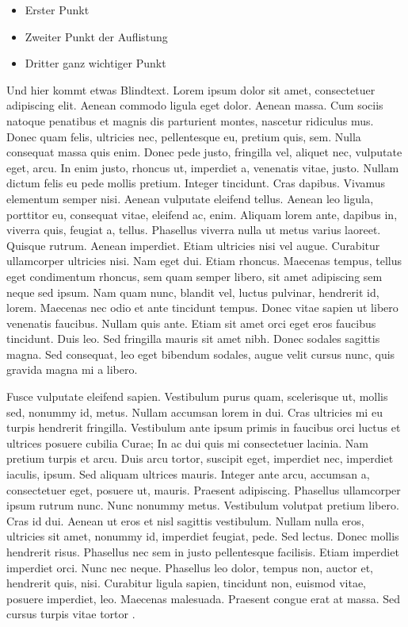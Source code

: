 \begin{itemize}
	\item Erster Punkt
	\item Zweiter Punkt der Auflistung
	\item Dritter ganz wichtiger Punkt
\end{itemize}

Und hier kommt etwas Blindtext. Lorem ipsum dolor sit amet, consectetuer adipiscing elit. Aenean commodo ligula eget dolor. Aenean massa. Cum sociis natoque penatibus et magnis dis parturient montes, nascetur ridiculus mus. Donec quam felis, ultricies nec, pellentesque eu, pretium quis, sem. Nulla consequat massa quis enim. Donec pede justo, fringilla vel, aliquet nec, vulputate eget, arcu. In enim justo, rhoncus ut, imperdiet a, venenatis vitae, justo. Nullam dictum felis eu pede mollis pretium. Integer tincidunt. Cras dapibus. Vivamus elementum semper nisi. Aenean vulputate eleifend tellus. Aenean leo ligula, porttitor eu, consequat vitae, eleifend ac, enim. Aliquam lorem ante, dapibus in, viverra quis, feugiat a, tellus. Phasellus viverra nulla ut metus varius laoreet. Quisque rutrum. Aenean imperdiet. Etiam ultricies nisi vel augue. Curabitur ullamcorper ultricies nisi. Nam eget dui. Etiam rhoncus. Maecenas tempus, tellus eget condimentum rhoncus, sem quam semper libero, sit amet adipiscing sem neque sed ipsum. Nam quam nunc, blandit vel, luctus pulvinar, hendrerit id, lorem. Maecenas nec odio et ante tincidunt tempus. Donec vitae sapien ut libero venenatis faucibus. Nullam quis ante. Etiam sit amet orci eget eros faucibus tincidunt. Duis leo. Sed fringilla mauris sit amet nibh. Donec sodales sagittis magna. Sed consequat, leo eget bibendum sodales, augue velit cursus nunc, quis gravida magna mi a libero. 

Fusce vulputate eleifend sapien. Vestibulum purus quam, scelerisque ut, mollis sed, nonummy id, metus. Nullam accumsan lorem in dui. Cras ultricies mi eu turpis hendrerit fringilla. Vestibulum ante ipsum primis in faucibus orci luctus et ultrices posuere cubilia Curae; In ac dui quis mi consectetuer lacinia. Nam pretium turpis et arcu. Duis arcu tortor, suscipit eget, imperdiet nec, imperdiet iaculis, ipsum. Sed aliquam ultrices mauris. Integer ante arcu, accumsan a, consectetuer eget, posuere ut, mauris. Praesent adipiscing. Phasellus ullamcorper ipsum rutrum nunc. Nunc nonummy metus. Vestibulum volutpat pretium libero. Cras id dui. Aenean ut eros et nisl sagittis vestibulum. Nullam nulla eros, ultricies sit amet, nonummy id, imperdiet feugiat, pede. Sed lectus. Donec mollis hendrerit risus. Phasellus nec sem in justo pellentesque facilisis. Etiam imperdiet imperdiet orci. Nunc nec neque. Phasellus leo dolor, tempus non, auctor et, hendrerit quis, nisi. Curabitur ligula sapien, tincidunt non, euismod vitae, posuere imperdiet, leo. Maecenas malesuada. Praesent congue erat at massa. Sed cursus turpis vitae tortor \cite{kurose_computernetzwerke:_2014}. 

